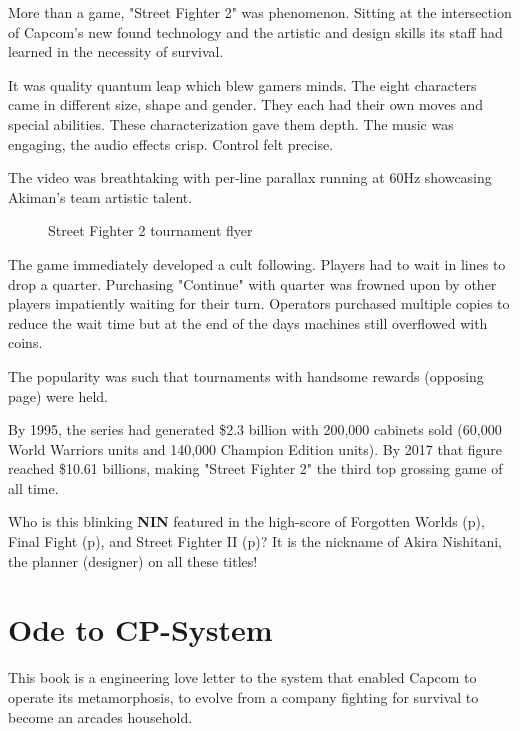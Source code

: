 More than a game, "Street Fighter 2" was phenomenon. Sitting at the intersection of Capcom's new found technology and the artistic and design skills its staff had learned in the necessity of survival.

It was quality quantum leap which blew gamers minds. The eight characters came in different size, shape and gender. They each had their own moves and special abilities. These characterization gave them depth. The music was engaging, the audio effects crisp. Control felt precise. 

The video was breathtaking with per-line parallax running at 60Hz showcasing Akiman's team artistic talent. 


\begin{figure}[H]
\caption*{Street Fighter 2 tournament flyer}
\end{figure}

The game immediately developed a cult following. Players had to wait in lines to drop a quarter. Purchasing "Continue" with quarter was frowned upon by other players impatiently waiting for their turn. Operators purchased multiple copies to reduce the wait time but at the end of the days machines still overflowed with coins\cite{sf2_oral_history}.

The popularity was such that tournaments with handsome rewards (opposing page) were held. 

By 1995, the series had generated \$2.3 billion with 200,000 cabinets sold\cite{usgamer20160101} (60,000 World Warriors units and 140,000 Champion Edition units). By 2017 that figure reached \$10.61 billions\cite{gamerevolution20140126}, making "Street Fighter 2" the third top grossing game of all time.

\begin{trivia}
Who is this blinking \textbf{NIN} featured in the high-score of Forgotten Worlds (p\pageref{nin_fw}), Final Fight (p\pageref{nin_ff}), and Street Fighter II (p\pageref{nin_sf2})? It is the nickname of Akira Nishitani, the planner (designer) on all these titles!
\end{trivia}

\section{Ode to CP-System}

This book is a engineering love letter to the system that enabled Capcom to operate its metamorphosis, to evolve from a company fighting for survival to become an arcades household.

